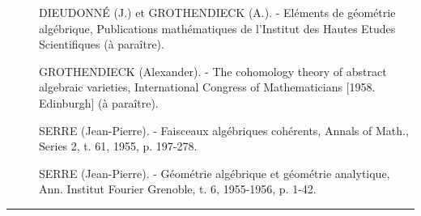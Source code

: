 \begin{description}
  \item[{\normalfont[1]}] DIEUDONNÉ (J.) et GROTHENDIECK (A.). - Eléments de
    géométrie algébrique, Publications mathématiques de l'Institut des Hautes
    Etudes Scientifiques (à paraître).
  \item[{\normalfont[2]}] GROTHENDIECK (Alexander). - The cohomology theory of
    abstract algebraic varieties, International Congress of Mathematicians
    [1958. Edinburgh] (à paraître).
  \item[{\normalfont[3]}] SERRE (Jean-Pierre). - Faisceaux algébriques
    cohérents, Annals of Math., Series 2, t. 61, 1955, p. 197-278.
  \item[{\normalfont[4]}] SERRE (Jean-Pierre). - Géométrie algébrique et
    géométrie analytique, Ann. Institut Fourier Grenoble, t. 6, 1955-1956,
    p. 1-42.
\end{description}

\begin{center}
  \rule{.16\linewidth}{.3pt}
\end{center}
